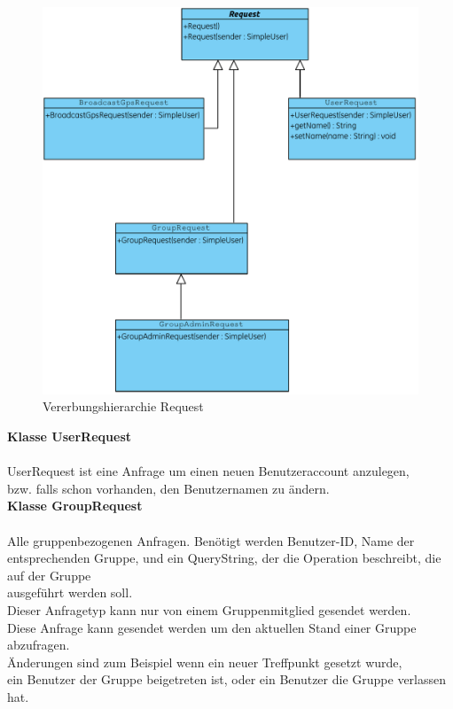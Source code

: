 \begin{figure}[h]
\hspace*{-1.8cm}\includegraphics[scale=1.0,trim=2 2 2 2,clip=true]{servergraphs/communication-request.pdf}
     \caption{Vererbungshierarchie Request}
\end{figure}
\clearpage

\textbf{Klasse UserRequest}\\
\\
UserRequest ist eine Anfrage um einen neuen Benutzeraccount anzulegen, \\
bzw. falls schon vorhanden, den Benutzernamen zu ändern.\\

\textbf{Klasse GroupRequest}\\
\\
Alle gruppenbezogenen Anfragen. Benötigt werden Benutzer-ID, Name der entsprechenden
Gruppe, und ein QueryString, der die Operation beschreibt, die auf der Gruppe\\
ausgeführt werden soll.\\
Dieser Anfragetyp kann nur von einem Gruppenmitglied gesendet werden.\\
Diese Anfrage kann gesendet werden um den aktuellen Stand einer Gruppe abzufragen.\\
Änderungen sind zum Beispiel wenn ein neuer Treffpunkt gesetzt wurde, \\
ein Benutzer der Gruppe beigetreten ist, oder ein Benutzer die Gruppe verlassen hat.\\

